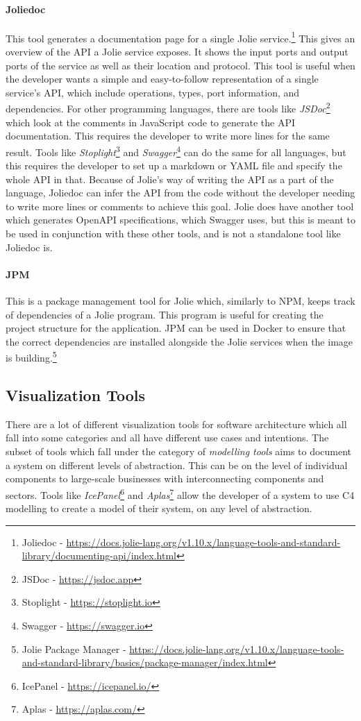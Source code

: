 \paragraph{Joliedoc} This tool generates a documentation page for a single Jolie service.\footnote{Joliedoc - \url{https://docs.jolie-lang.org/v1.10.x/language-tools-and-standard-library/documenting-api/index.html}} This gives an overview of the API a Jolie service exposes. It shows the input ports and output ports of the service as well as their location and protocol.
This tool is useful when the developer wants a simple and easy-to-follow representation of a single service's API, which include operations, types, port information, and dependencies.
For other programming languages, there are tools like \emph{JSDoc}\footnote{JSDoc - \url{https://jsdoc.app}} which look at the comments in JavaScript code to generate the API documentation. This requires the developer to write more lines for the same result.
Tools like \emph{Stoplight}\footnote{Stoplight - \url{https://stoplight.io}} and \emph{Swagger}\footnote{Swagger - \url{https://swagger.io}} can do the same for all languages, but this requires the developer to set up a markdown or YAML file and specify the whole API in that.
Because of Jolie's way of writing the API as a part of the language, Joliedoc can infer the API from the code without the developer needing to write more lines or comments to achieve this goal.
Jolie does have another tool which generates OpenAPI specifications, which Swagger uses, but this is meant to be used in conjunction with these other tools, and is not a standalone tool like Joliedoc is.

\paragraph{JPM} This is a package management tool for Jolie which, similarly to NPM, keeps track of dependencies of a Jolie program.
This program is useful for creating the project structure for the application. JPM can be used in Docker to ensure that the correct dependencies are installed alongside the Jolie services when the image is building.\footnote{Jolie Package Manager - \url{https://docs.jolie-lang.org/v1.10.x/language-tools-and-standard-library/basics/package-manager/index.html}} 

\subsection{Visualization Tools}
There are a lot of different visualization tools for software architecture which all fall into some categories and all have different use cases and intentions.
The subset of tools which fall under the category of \emph{modelling tools} aims to document a system on different levels of abstraction. This can be on the level of individual components to large-scale businesses with interconnecting components and sectors.
Tools like \emph{IcePanel}\footnote{IcePanel - \url{https://icepanel.io/}} and \emph{Aplas}\footnote{Aplas - \url{https://aplas.com/}} allow the developer of a system to use C4 modelling to create a model of their system, on any level of abstraction.

